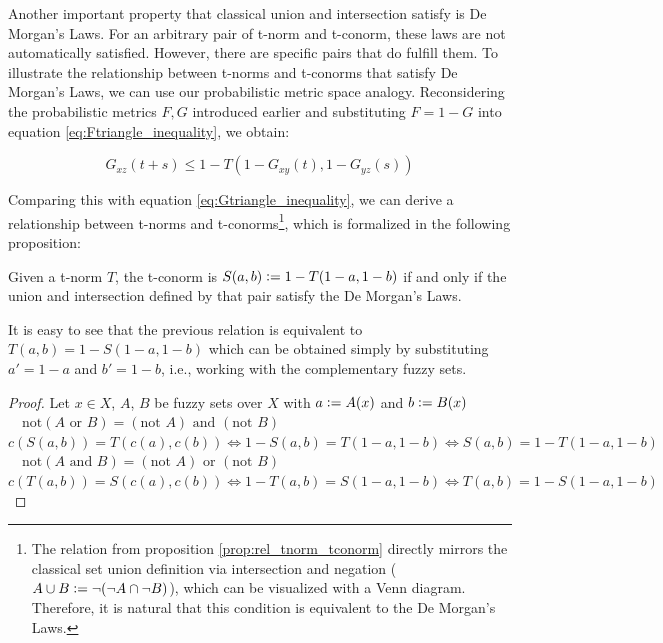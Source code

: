 Another important property that classical union and intersection satisfy is De Morgan's Laws. For an arbitrary pair of t-norm and t-conorm, these laws are not automatically satisfied. However, there are specific pairs that do fulfill them. To illustrate the relationship between t-norms and t-conorms that satisfy De Morgan's Laws, we can use our probabilistic metric space analogy. Reconsidering the probabilistic metrics $F,G$ introduced earlier and substituting $F = 1 - G$ into equation \ref{eq:Ftriangle_inequality}, we obtain:

\[ G_{xz}(t + s) \leq 1 - T(1 - G_{xy}(t), 1 - G_{yz}(s))\]

Comparing this with equation \ref{eq:Gtriangle_inequality}, we can derive a relationship between t-norms and t-conorms\footnote{The relation from proposition \ref{prop:rel_tnorm_tconorm} directly mirrors the classical set union definition via intersection and negation ($A\cup B \mathrel{\mathop:}= \neg (\neg A \cap \neg B)$), which can be visualized with a Venn diagram. Therefore, it is natural that this condition is equivalent to the De Morgan's Laws.}, which is formalized in the following proposition:

\begin{proposition}\label{prop:rel_tnorm_tconorm}
  Given a t-norm $T$, the t-conorm is $S(a,b)\mathrel{\mathop:}= 1 - T(1-a, 1-b)$ if and only if the union and intersection defined by that pair satisfy the De Morgan's Laws.
\end{proposition}
\begin{remark}
  It is easy to see that the previous relation is equivalent to $T(a,b) = 1-S(1-a, 1-b)$ which can be obtained simply by substituting $a'=1-a$ and $b'=1-b$, i.e., working with the complementary fuzzy sets.
\end{remark}

\begin{proof}
  Let $x\in X$, $A$, $B$ be fuzzy sets over $X$ with $a \mathrel{\mathop:}= A(x)$ and $b \mathrel{\mathop:}= B(x)$\\

  $\quad \boxed{\text{not}(A \text{ or } B) = (\text{not } A) \text{ and } (\text{not } B)}$\\
  [0.5em]
  $c( S(a,b)) = T(c( a), c( b)) \iff 1 - S(a,b) = T(1-a, 1-b) \iff S(a,b) = 1 - T(1-a, 1-b)$\\

  $\quad \boxed{\text{not}(A \text{ and } B) = (\text{not } A) \text{ or } (\text{not } B)}$\\
  [0.5em]
  $c( T(a,b)) = S(c( a), c( b)) \iff 1 - T(a,b) = S(1-a, 1-b) \iff T(a,b) = 1 - S(1-a, 1-b)$

\end{proof}

